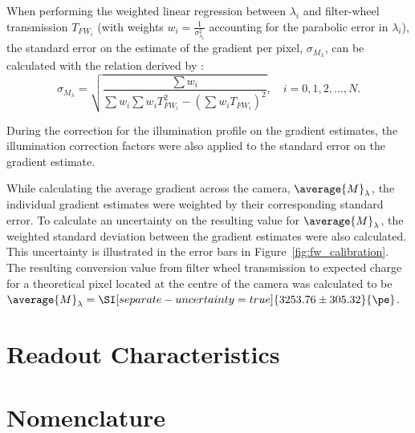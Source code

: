 When performing the weighted linear regression between $\lambda_i$ and filter-wheel transmission $T_{FW_i}$ (with weights $w_i = \frac{1}{\sigma_{\lambda_i}^2}$ accounting for the parabolic error in $\lambda_i$), the standard error on the estimate of the gradient per pixel, $\sigma_{M_\lambda}$, can be calculated with the relation derived by \textcite{Taylor1997}:
\begin{equation} \label{eq:wmerr}
\sigma_{M_\lambda} = \sqrt{\frac{\sum w_i}{\sum w_i \sum w_i T_{FW_i}^2 - (\sum w_i T_{FW_i})^2}}, \quad i = 0, 1, 2, ..., N.
\end{equation}

During the correction for the illumination profile on the gradient estimates, the illumination correction factors were also applied to the standard error on the gradient estimate.

While calculating the average gradient across the camera, $\average{M}_\lambda$, the individual gradient estimates were weighted by their corresponding standard error. To calculate an uncertainty on the resulting value for $\average{M}_\lambda$, the weighted standard deviation between the gradient estimates were also calculated. This uncertainty is illustrated in the error bars in Figure~\ref{fig:fw_calibration}. The resulting conversion value from filter wheel transmission to expected charge for a theoretical pixel located at the centre of the camera was calculated to be $\average{M}_\lambda = \SI[separate-uncertainty = true]{3253.76 \pm 305.32}{\pe}$.


\section{Readout Characteristics} \label{section:readout_characteristics}



\section{Nomenclature}

